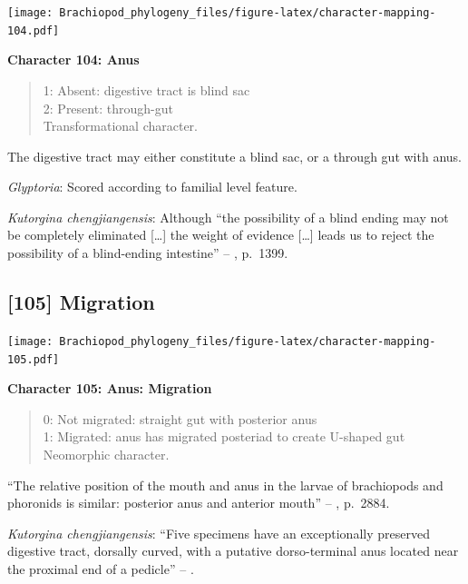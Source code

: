\documentclass[openany]{book}
\theoremstyle{definition}
\theoremstyle{definition}
\theoremstyle{definition}
\theoremstyle{remark}
\begin{document}
\texttt{[image: Brachiopod\_phylogeny\_files/figure-latex/character-mapping-104.pdf]}

\textbf{Character 104: Anus}

\begin{quote}
1: Absent: digestive tract is blind sac\\
2: Present: through-gut\\
Transformational character.
\end{quote}

The digestive tract may either constitute a blind sac, or a through gut
with anus.

\hypertarget{Glyptoria-coding-104}{}
\emph{Glyptoria}: Scored according to familial level feature.

\hypertarget{Kutorgina_chengjiangensis-coding-104}{}
\emph{Kutorgina chengjiangensis}: Although ``the possibility of a blind
ending may not be completely eliminated {[}\ldots{}{]} the weight of
evidence {[}\ldots{}{]} leads us to reject the possibility of a
blind-ending intestine'' --
\citet{Zhang2007Rhynchonelliformeanbrachiopods}, p.~1399.

\subsection*{{[}105{]} Migration}\label{migration}

\texttt{[image: Brachiopod\_phylogeny\_files/figure-latex/character-mapping-105.pdf]}

\textbf{Character 105: Anus: Migration}

\begin{quote}
0: Not migrated: straight gut with posterior anus\\
1: Migrated: anus has migrated posteriad to create U-shaped gut\\
Neomorphic character.
\end{quote}

``The relative position of the mouth and anus in the larvae of
brachiopods and phoronids is similar: posterior anus and anterior
mouth'' -- \citet{Williams2007Supplement}, p.~2884.

\hypertarget{Kutorgina_chengjiangensis-coding-105}{}
\emph{Kutorgina chengjiangensis}: ``Five specimens have an exceptionally
preserved digestive tract, dorsally curved, with a putative
dorso-terminal anus located near the proximal end of a pedicle'' --
\citet{Zhang2007Rhynchonelliformeanbrachiopods}.
\end{document}
